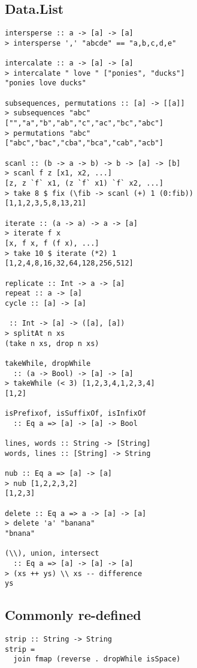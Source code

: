 \begin{multicols}{2}
\begin{box1}
\subsection *{Data.List}
\begin{verbatim}
intersperse :: a -> [a] -> [a]
> intersperse ',' "abcde" == "a,b,c,d,e"

intercalate :: a -> [a] -> [a]
> intercalate " love " ["ponies", "ducks"]
"ponies love ducks"

subsequences, permutations :: [a] -> [[a]]
> subsequences "abc"
["","a","b","ab","c","ac","bc","abc"]
> permutations "abc"
["abc","bac","cba","bca","cab","acb"]

scanl :: (b -> a -> b) -> b -> [a] -> [b]
> scanl f z [x1, x2, ...]
[z, z `f` x1, (z `f` x1) `f` x2, ...]
> take 8 $ fix (\fib -> scanl (+) 1 (0:fib))
[1,1,2,3,5,8,13,21]

iterate :: (a -> a) -> a -> [a]
> iterate f x
[x, f x, f (f x), ...]
> take 10 $ iterate (*2) 1
[1,2,4,8,16,32,64,128,256,512]

replicate :: Int -> a -> [a]
repeat :: a -> [a]
cycle :: [a] -> [a]

 :: Int -> [a] -> ([a], [a])
> splitAt n xs
(take n xs, drop n xs)

takeWhile, dropWhile
  :: (a -> Bool) -> [a] -> [a]
> takeWhile (< 3) [1,2,3,4,1,2,3,4]
[1,2]

isPrefixof, isSuffixOf, isInfixOf
  :: Eq a => [a] -> [a] -> Bool

lines, words :: String -> [String]
words, lines :: [String] -> String

nub :: Eq a => [a] -> [a]
> nub [1,2,2,3,2]
[1,2,3]

delete :: Eq a => a -> [a] -> [a]
> delete 'a' "banana"
"bnana"

(\\), union, intersect
  :: Eq a => [a] -> [a] -> [a]
> (xs ++ ys) \\ xs -- difference
ys
\end{verbatim}
\end{box1}

\begin{box2}
\subsection *{Commonly re-defined}
\begin{verbatim}
strip :: String -> String
strip =
  join fmap (reverse . dropWhile isSpace)


\end{verbatim}
\end{box2}
\end{multicols}

